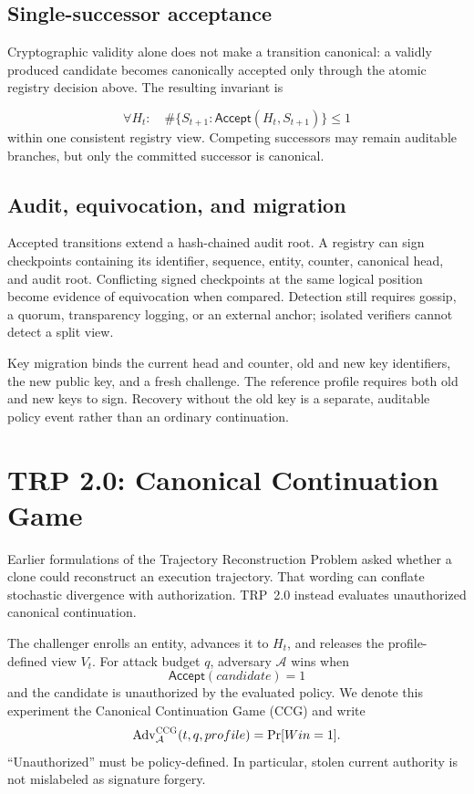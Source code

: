 \documentclass[11pt]{article}
\newcommand{\ccg}{\textsc{CCG}}
\newcommand{\Accept}{\mathsf{Accept}}
\begin{document}
\subsection{Single-successor acceptance}
Cryptographic validity alone does not make a transition canonical: a validly produced candidate becomes canonically accepted only through the atomic registry decision above. The resulting invariant is

\begin{equation}
  \forall H_t:\quad \#\{S_{t+1}:\Accept(H_t,S_{t+1})\}\leq 1
  \label{eq:single-successor}
\end{equation}
within one consistent registry view. Competing successors may remain auditable branches, but only the committed successor is canonical.

\subsection{Audit, equivocation, and migration}
Accepted transitions extend a hash-chained audit root. A registry can sign checkpoints containing its identifier, sequence, entity, counter, canonical head, and audit root. Conflicting signed checkpoints at the same logical position become evidence of equivocation when compared. Detection still requires gossip, a quorum, transparency logging, or an external anchor; isolated verifiers cannot detect a split view.

Key migration binds the current head and counter, old and new key identifiers, the new public key, and a fresh challenge. The reference profile requires both old and new keys to sign. Recovery without the old key is a separate, auditable policy event rather than an ordinary continuation.

\section{TRP 2.0: Canonical Continuation Game}
Earlier formulations of the Trajectory Reconstruction Problem asked whether a clone could reconstruct an execution trajectory. That wording can conflate stochastic divergence with authorization. TRP~2.0 instead evaluates unauthorized canonical continuation.

The challenger enrolls an entity, advances it to $H_t$, and releases the profile-defined view $V_t$. For attack budget $q$, adversary $\mathcal{A}$ wins when
\begin{equation}
  \Accept(candidate)=1
\end{equation}
and the candidate is unauthorized by the evaluated policy. We denote this experiment the Canonical Continuation Game (\ccg) and write
\begin{equation}
  \mathrm{Adv}^{\ccg}_{\mathcal{A}}(t,q,profile)=\Pr[Win=1].
\end{equation}
``Unauthorized'' must be policy-defined. In particular, stolen current authority is not mislabeled as signature forgery.
\end{document}
